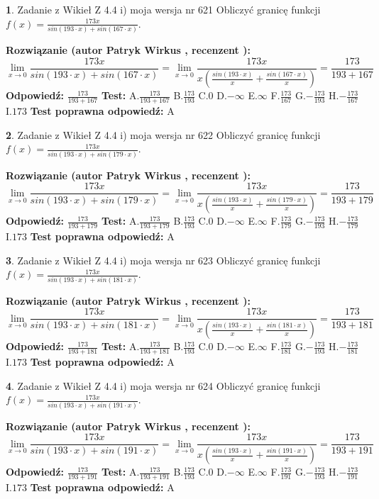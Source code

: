 \documentclass[12pt, a4paper]{article}
\theoremstyle{definition} %
\newtheorem{zad}{}
\newcommand{\zadStart}[1]{\begin{zad}#1\newline}
\newcommand{\zadStop}{\end{zad}}
\newcommand{\rozwStart}[2]{\noindent \textbf{Rozwiązanie (autor #1 , recenzent #2): }\newline}
\newcommand{\rozwStop}{\newline}
\newcommand{\odpStart}{\noindent \textbf{Odpowiedź:}\newline}
\newcommand{\odpStop}{\newline}
\newcommand{\testStart}{\noindent \textbf{Test:}\newline}
\newcommand{\testStop}{\newline}
\newcommand{\kluczStart}{\noindent \textbf{Test poprawna odpowiedź:}\newline}
\newcommand{\kluczStop}{\newline}
\begin{document}
\zadStart{Zadanie z Wikieł Z 4.4 i) moja wersja nr 621}
Obliczyć granicę funkcji $f(x)=\frac{173x}{sin(193\cdot x) +sin(167\cdot x)}$.
\zadStop
\rozwStart{Patryk Wirkus}{}
$$\lim\limits_{x\to 0}\frac{173x}{sin(193\cdot x) +sin(167\cdot x)}=\lim\limits_{x\to 0}\frac{173x}{x(\frac{sin(193\cdot x)}{x}+\frac{sin(167\cdot x)}{x})}=\frac{173}{193+167}$$
\rozwStop
\odpStart
$\frac{173}{193+167}$
\odpStop
\testStart
A.$\frac{173}{193+167}$
B.$\frac{173}{193}$
C.$0$
D.$-\infty$
E.$\infty$
F.$\frac{173}{167}$
G.$-\frac{173}{193}$
H.$-\frac{173}{167}$
I.$173$
\testStop
\kluczStart
A
\kluczStop



\zadStart{Zadanie z Wikieł Z 4.4 i) moja wersja nr 622}
Obliczyć granicę funkcji $f(x)=\frac{173x}{sin(193\cdot x) +sin(179\cdot x)}$.
\zadStop
\rozwStart{Patryk Wirkus}{}
$$\lim\limits_{x\to 0}\frac{173x}{sin(193\cdot x) +sin(179\cdot x)}=\lim\limits_{x\to 0}\frac{173x}{x(\frac{sin(193\cdot x)}{x}+\frac{sin(179\cdot x)}{x})}=\frac{173}{193+179}$$
\rozwStop
\odpStart
$\frac{173}{193+179}$
\odpStop
\testStart
A.$\frac{173}{193+179}$
B.$\frac{173}{193}$
C.$0$
D.$-\infty$
E.$\infty$
F.$\frac{173}{179}$
G.$-\frac{173}{193}$
H.$-\frac{173}{179}$
I.$173$
\testStop
\kluczStart
A
\kluczStop



\zadStart{Zadanie z Wikieł Z 4.4 i) moja wersja nr 623}
Obliczyć granicę funkcji $f(x)=\frac{173x}{sin(193\cdot x) +sin(181\cdot x)}$.
\zadStop
\rozwStart{Patryk Wirkus}{}
$$\lim\limits_{x\to 0}\frac{173x}{sin(193\cdot x) +sin(181\cdot x)}=\lim\limits_{x\to 0}\frac{173x}{x(\frac{sin(193\cdot x)}{x}+\frac{sin(181\cdot x)}{x})}=\frac{173}{193+181}$$
\rozwStop
\odpStart
$\frac{173}{193+181}$
\odpStop
\testStart
A.$\frac{173}{193+181}$
B.$\frac{173}{193}$
C.$0$
D.$-\infty$
E.$\infty$
F.$\frac{173}{181}$
G.$-\frac{173}{193}$
H.$-\frac{173}{181}$
I.$173$
\testStop
\kluczStart
A
\kluczStop



\zadStart{Zadanie z Wikieł Z 4.4 i) moja wersja nr 624}
Obliczyć granicę funkcji $f(x)=\frac{173x}{sin(193\cdot x) +sin(191\cdot x)}$.
\zadStop
\rozwStart{Patryk Wirkus}{}
$$\lim\limits_{x\to 0}\frac{173x}{sin(193\cdot x) +sin(191\cdot x)}=\lim\limits_{x\to 0}\frac{173x}{x(\frac{sin(193\cdot x)}{x}+\frac{sin(191\cdot x)}{x})}=\frac{173}{193+191}$$
\rozwStop
\odpStart
$\frac{173}{193+191}$
\odpStop
\testStart
A.$\frac{173}{193+191}$
B.$\frac{173}{193}$
C.$0$
D.$-\infty$
E.$\infty$
F.$\frac{173}{191}$
G.$-\frac{173}{193}$
H.$-\frac{173}{191}$
I.$173$
\testStop
\kluczStart
A
\kluczStop
\end{document}
